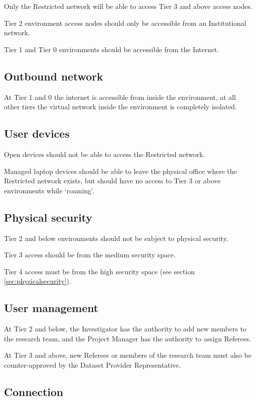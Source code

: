 \documentclass[10pt,a4paper,twocolumn]{article}
\begin{document}
Only the Restricted network will be able to access Tier 3 and above access nodes.

Tier 2 environment access nodes should only be accessible from an Institutional network.

Tier 1 and Tier 0 environments should be accessible from the Internet.

\subsection{Outbound network}

At Tier 1 and 0 the internet is accessible from inside the environment,
at all other tiers the virtual network inside the environment is completely isolated.

\subsection{User devices}

Open devices should not be able to access the Restricted network.

Managed laptop devices should be able to leave the physical office where the Restricted network exists, but should have no access to Tier 3 or above environments while `roaming'.

\subsection{Physical security}

Tier 2 and below environments should not be subject to physical security.

Tier 3 access should be from the medium security space.

Tier 4 access must be from the high security space (see section \ref{sec:physicalsecurity}).

\subsection{User management}

At Tier 2 and below, the Investigator has the authority to add new members to the research team, and the Project Manager has the authority to assign Referees.

At Tier 3 and above, new Referees or members of the research team must also be counter-approved by the Dataset Provider Representative.

\subsection{Connection}
\end{document}
